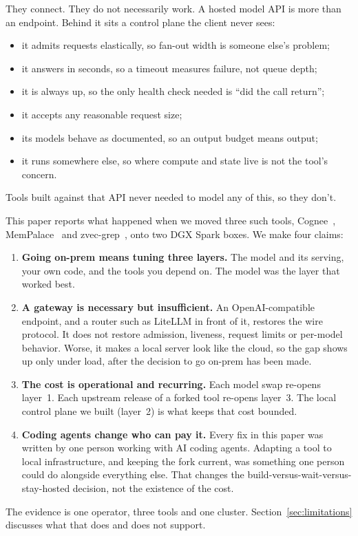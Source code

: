 \documentclass[11pt]{article}
\begin{document}
They connect. They do not necessarily work. A hosted model API is more than an endpoint. Behind it
sits a control plane the client never sees:
\begin{itemize}
  \item it admits requests elastically, so fan-out width is someone else's problem;
  \item it answers in seconds, so a timeout measures failure, not queue depth;
  \item it is always up, so the only health check needed is ``did the call return'';
  \item it accepts any reasonable request size;
  \item its models behave as documented, so an output budget means output;
  \item it runs somewhere else, so where compute and state live is not the tool's concern.
\end{itemize}
Tools built against that API never needed to model any of this, so they don't.

This paper reports what happened when we moved three such tools, Cognee~\cite{cognee},
MemPalace~\cite{mempalace} and zvec-grep~\cite{zvecgrep}, onto two DGX Spark boxes. We make four
claims:
\begin{enumerate}
  \item \textbf{Going on-prem means tuning three layers.} The model and its serving, your own code,
    and the tools you depend on. The model was the layer that worked best.
  \item \textbf{A gateway is necessary but insufficient.} An OpenAI-compatible endpoint, and a
    router such as LiteLLM in front of it, restores the wire protocol. It does not restore
    admission, liveness, request limits or per-model behavior. Worse, it makes a local server look
    like the cloud, so the gap shows up only under load, after the decision to go on-prem has been
    made.
  \item \textbf{The cost is operational and recurring.} Each model swap re-opens layer~1. Each
    upstream release of a forked tool re-opens layer~3. The local control plane we built
    (layer~2) is what keeps that cost bounded.
  \item \textbf{Coding agents change who can pay it.} Every fix in this paper was written by one
    person working with AI coding agents. Adapting a tool to local infrastructure, and keeping the
    fork current, was something one person could do alongside everything else. That changes the
    build-versus-wait-versus-stay-hosted decision, not the existence of the cost.
\end{enumerate}
The evidence is one operator, three tools and one cluster. Section~\ref{sec:limitations} discusses
what that does and does not support.
\end{document}

